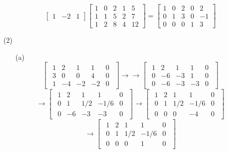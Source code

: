 \documentclass[openany]{book}
\begin{document}
\begin{itemize}
\begin{itemize}
$$\begin{bmatrix}
1 & -2 & 1
\end{bmatrix}\begin{bmatrix}
1 & 0 & 2 & 1 & 5 \\
1 & 1 & 5 & 2 & 7 \\
1 & 2 & 8 & 4 & 12
\end{bmatrix} = \begin{bmatrix}
1 & 0 & 2 & 0 & 2 \\
0 & 1 & 3 & 0 & -1 \\
0 & 0 & 0 & 1 & 3
\end{bmatrix}$$
\end{itemize}
\item[(2)]
\begin{itemize}
\item[(a)]
$$\begin{bmatrix}
\begin{array}{cccc|c}
1 & 2 & 1 & 1 & 0 \\
3 & 0 & 0 & 4 & 0 \\
1 & -4 & -2 & -2 & 0
\end{array}
\end{bmatrix} \rightarrow\rightarrow \begin{bmatrix}
\begin{array}{cccc|c}
1 & 2 & 1 & 1 & 0 \\
0 & -6 & -3 & 1 & 0 \\
0 & -6 & -3 & -3 & 0
\end{array}
\end{bmatrix}$$
$$ \rightarrow \begin{bmatrix}
\begin{array}{cccc|c}
1 & 2 & 1 & 1 & 0 \\
0 & 1 & 1/2 & -1/6 & 0 \\
0 & -6 & -3 & -3 & 0
\end{array}
\end{bmatrix} \rightarrow \begin{bmatrix}
\begin{array}{cccc|c}
1 & 2 & 1 & 1 & 0 \\
0 & 1 & 1/2 & -1/6 & 0 \\
0 & 0 & 0 & -4 & 0
\end{array}
\end{bmatrix}$$
$$\rightarrow \begin{bmatrix}
\begin{array}{cccc|c}
1 & 2 & 1 & 1 & 0 \\
0 & 1 & 1/2 & -1/6 & 0 \\
0 & 0 & 0 & 1 & 0
\end{array}

\end{bmatrix}$$
\end{itemize}
\end{itemize}
\end{document}
